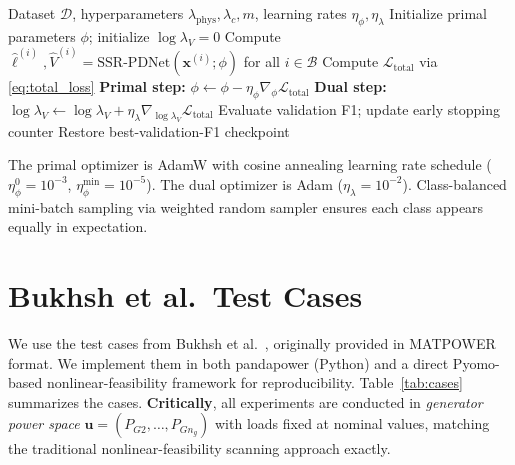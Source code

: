 \documentclass[journal]{IEEEtran}
\newcommand{\Loss}{\mathcal{L}}
\newcommand{\bx}{\mathbf{x}}
\begin{document}
\begin{algorithm}[t]
  \caption{SSR-PDNet Training}
  \label{alg:training}
  \begin{algorithmic}[1]
    \Require Dataset $\mathcal{D}$, hyperparameters $\lambda_{\mathrm{phys}},\lambda_c,m$,
      learning rates $\eta_\phi, \eta_\lambda$
    \State Initialize primal parameters $\phi$; initialize $\log\lambda_V = 0$
        \State Compute $\hat{\ell}^{(i)}, \hat{V}^{(i)} = \mathrm{SSR\text{-}PDNet}(\bx^{(i)};\phi)$
          for all $i \in \mathcal{B}$
        \State Compute $\Loss_{\mathrm{total}}$ via \eqref{eq:total_loss}
        \State \textbf{Primal step:} $\phi \leftarrow \phi - \eta_\phi \nabla_\phi \Loss_{\mathrm{total}}$
        \State \textbf{Dual step:} $\log\lambda_V \leftarrow \log\lambda_V + \eta_\lambda \nabla_{\log\lambda_V} \Loss_{\mathrm{total}}$
      \EndFor
      \State Evaluate validation F1; update early stopping counter
    \EndFor
    \State Restore best-validation-F1 checkpoint
  \end{algorithmic}
\end{algorithm}

The primal optimizer is AdamW with cosine annealing learning rate schedule
($\eta_\phi^0 = 10^{-3}$, $\eta_\phi^{\min} = 10^{-5}$). The dual optimizer
is Adam ($\eta_\lambda = 10^{-2}$). Class-balanced mini-batch sampling via
weighted random sampler ensures each class appears equally in expectation.

\section{Bukhsh et al.\ Test Cases}
\label{sec:cases}

We use the test cases from Bukhsh et al.~\cite{bukhsh2013local}, originally
provided in MATPOWER format. We implement them in both pandapower (Python) and
a direct Pyomo-based nonlinear-feasibility framework for reproducibility. Table~\ref{tab:cases} summarizes
the cases. \textbf{Critically}, all experiments are conducted in
\emph{generator power space} $\mathbf{u} = (P_{G2},\ldots,P_{Gn_g})$ with loads
fixed at nominal values, matching the traditional nonlinear-feasibility scanning approach exactly.
\end{document}
